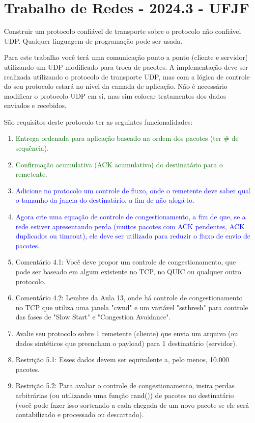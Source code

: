 \documentclass[12pt]{article}
\begin{document}
\section*{Trabalho de Redes - 2024.3 - UFJF}

Construir um protocolo confiável de transporte sobre o protocolo não confiável UDP. Qualquer linguagem de programação pode ser usada.

\vspace{2em}

Para este trabalho você terá uma comunicação ponto a ponto (cliente e servidor) utilizando um UDP modificado para troca de pacotes. A implementação deve ser realizada utilizando o protocolo de transporte UDP, mas com a lógica de controle do seu protocolo estará no nível da camada de aplicação. Não é necessário modificar o protocolo UDP em si, mas sim colocar tratamentos dos dados enviados e recebidos.

São requisitos deste protocolo ter as seguintes funcionalidades:

\begin{enumerate}
    \item \textcolor{darkgreen}{Entrega ordenada para aplicação baseado na ordem dos pacotes (ter \# de sequência)}.
    \item \textcolor{darkgreen}{Confirmação acumulativa (ACK acumulativo) do destinatário para o remetente.}
    \item \textcolor{blue}{Adicione no protocolo um controle de fluxo, onde o remetente deve saber qual o tamanho da janela do destinatário, a fim de não afogá-lo.}
    \item \textcolor{blue}{Agora crie uma equação de controle de congestionamento, a fim de que, se a rede estiver apresentando perda (muitos pacotes com ACK pendentes, ACK duplicados ou timeout), ele deve ser utilizado para reduzir o fluxo de envio de pacotes.}
    \item Comentário 4.1: Você deve propor um controle de congestionamento, que pode ser baseado em algum existente no TCP, no QUIC ou qualquer outro protocolo. 
    \item Comentário 4.2: Lembre da Aula 13, onde há controle de congestionamento no TCP que utiliza uma janela "cwnd" e um variável "ssthresh" para controle das fases de "Slow Start" e "Congestion Avoidance".
    \item Avalie seu protocolo sobre 1 remetente (cliente) que envia um arquivo (ou dados sintéticos que preencham o payload) para 1 destinatário (servidor). 
    \item Restrição 5.1: Esses dados devem ser equivalente a, pelo menos, 10.000 pacotes. 
    \item Restrição 5.2: Para avaliar o controle de congestionamento, insira perdas arbitrárias (ou utilizando uma função rand()) de pacotes no destinatário (você pode fazer isso sorteando a cada chegada de um novo pacote se ele será contabilizado e processado ou descartado).
\end{enumerate}
\end{document}
